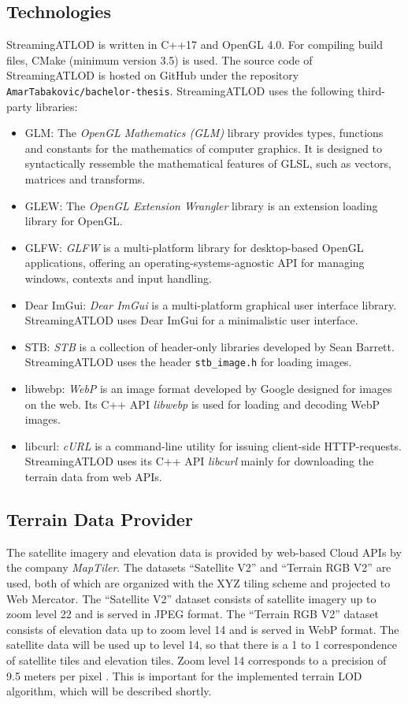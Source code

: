 \subsection{Technologies}
StreamingATLOD is written in C++17 and OpenGL 4.0. For compiling build files,
CMake (minimum version 3.5) is used. The source code of StreamingATLOD 
is hosted on GitHub under the repository \texttt{AmarTabakovic/bachelor-thesis}. StreamingATLOD uses the following third-party
libraries:
\begin{itemize}
  \item GLM: The \textit{OpenGL Mathematics (GLM)} library provides types, functions and constants 
             for the mathematics of computer graphics. It is designed to syntactically ressemble 
             the mathematical features of GLSL, such as vectors, matrices and transforms.
  \item GLEW: The \textit{OpenGL Extension Wrangler} library is an extension loading library for OpenGL.
  \item GLFW: \textit{GLFW} is a multi-platform library for desktop-based OpenGL applications, 
              offering an operating-systems-agnostic API for managing windows, contexts and input handling.
  \item Dear ImGui: \textit{Dear ImGui} is a multi-platform graphical user interface library. StreamingATLOD uses 
          Dear ImGui for a minimalistic user interface.
  \item STB: \textit{STB} is a collection of header-only libraries developed by Sean Barrett. StreamingATLOD uses 
            the header \texttt{stb\_image.h} for loading images.
  \item libwebp: \textit{WebP} is an image format developed by Google designed for images on the web. Its C++ API \textit{libwebp} is used for
                 loading and decoding WebP images.
  \item libcurl: \textit{cURL} is a command-line utility for issuing client-side HTTP-requests. StreamingATLOD uses its 
                  C++ API \textit{libcurl} mainly for downloading the terrain data from web APIs.
\end{itemize}

\subsection{Terrain Data Provider}
The satellite imagery and elevation data is provided by web-based Cloud APIs by the company \textit{MapTiler}.
The datasets ``Satellite V2'' and ``Terrain RGB V2'' are used,
both of which are organized with the XYZ tiling scheme
and projected to Web Mercator. 
The ``Satellite V2'' dataset 
consists of satellite imagery up to zoom level 22 and is served in JPEG format.
The ``Terrain RGB V2'' dataset consists of elevation data up to zoom level 14 and is served in WebP format.
The satellite data will be used up to level 14,
so that there is a 1 to 1 correspondence of satellite tiles and elevation tiles.
Zoom level 14 corresponds to a precision of 9.5 meters per pixel \cite{maptilerzoom}.
This is important for the implemented terrain LOD algorithm, which will be described shortly.

